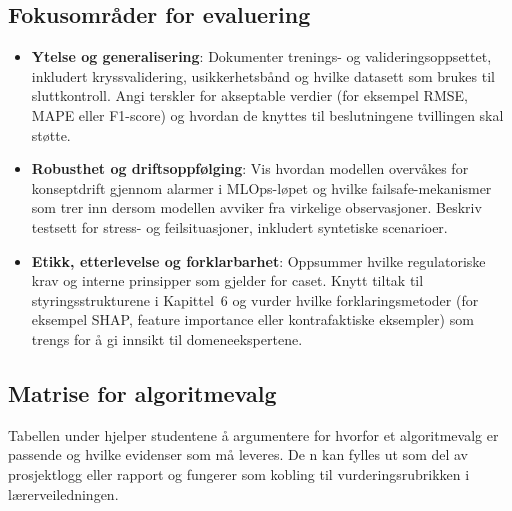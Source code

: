 \subsection{Fokusområder for evaluering}
\begin{itemize}
    \item \textbf{Ytelse og generalisering}: Dokumenter trenings- og valideringsoppsettet, inkludert kryssvalidering, usikkerhetsbånd og hvilke datasett som brukes til sluttkontroll. Angi terskler for akseptable verdier (for eksempel RMSE, MAPE eller F1-score) og hvordan de knyttes til beslutningene tvillingen skal støtte.
    \item \textbf{Robusthet og driftsoppfølging}: Vis hvordan modellen overvåkes for konseptdrift gjennom alarmer i MLOps-løpet og hvilke failsafe-mekanismer som trer inn dersom modellen avviker fra virkelige observasjoner. Beskriv testsett for stress- og feilsituasjoner, inkludert syntetiske scenarioer.
    \item \textbf{Etikk, etterlevelse og forklarbarhet}: Oppsummer hvilke regulatoriske krav og interne prinsipper som gjelder for caset. Knytt tiltak til styringsstrukturene i Kapittel~6 og vurder hvilke forklaringsmetoder (for eksempel SHAP, feature importance eller kontrafaktiske eksempler) som trengs for å gi innsikt til domeneekspertene.
\end{itemize}

\subsection{Matrise for algoritmevalg}
Tabellen under hjelper studentene å argumentere for hvorfor et algoritmevalg er passende og hvilke evidenser som må leveres. De
n kan fylles ut som del av prosjektlogg eller rapport og fungerer som kobling til vurderingsrubrikken i lærerveiledningen.

